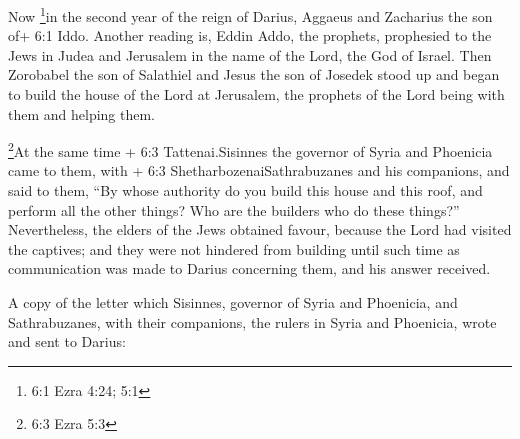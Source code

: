  Now \footnote{6:1 Ezra 4:24; 5:1}in the second year of the
reign of Darius, Aggaeus and Zacharius the son of+ 6:1 Iddo. Another
reading is, Eddin Addo, the prophets, prophesied to the Jews in Judea
and Jerusalem in the name of the Lord, the God of Israel. 
Then Zorobabel the son of Salathiel and Jesus the son of Josedek stood
up and began to build the house of the Lord at Jerusalem, the prophets
of the Lord being with them and helping them.

 \footnote{6:3 Ezra 5:3}At the same time + 6:3
Tattenai.Sisinnes the governor of Syria and Phoenicia came to them, with
+ 6:3 ShetharbozenaiSathrabuzanes and his companions, and said to them,
 ``By whose authority do you build this house and this roof,
and perform all the other things? Who are the builders who do these
things?''  Nevertheless, the elders of the Jews obtained
favour, because the Lord had visited the captives;  and they
were not hindered from building until such time as communication was
made to Darius concerning them, and his answer received.

 A copy of the letter which Sisinnes, governor of Syria and
Phoenicia, and Sathrabuzanes, with their companions, the rulers in Syria
and Phoenicia, wrote and sent to Darius:

